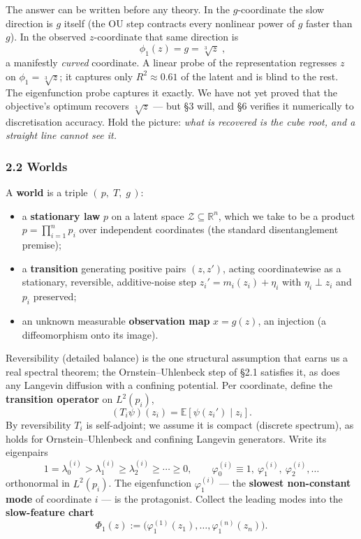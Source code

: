 \documentclass[
  letterpaper,
  11pt]{article}
\providecommand{\tightlist}{%
  \setlength{\itemsep}{0pt}\setlength{\parskip}{0pt}}
\theoremstyle{plain}
\theoremstyle{definition}
\theoremstyle{remark}
\begin{document}
The answer can be written before any theory. In the \(g\)-coordinate the slow direction is \(g\) itself (the OU step contracts every nonlinear power of \(g\) faster than \(g\)). In the observed \(z\)-coordinate that same direction is
\[\boxed{\;\phi_1(z) = g = \sqrt[3]{z}\;,}\]
a manifestly \emph{curved} coordinate. A linear probe of the representation regresses \(z\) on \(\phi_1=\sqrt[3]{z}\); it captures only \(R^2\approx 0.61\) of the latent and is blind to the rest. The eigenfunction probe captures it exactly. We have not yet proved that the objective's optimum recovers \(\sqrt[3]{z}\) --- but §3 will, and §6 verifies it numerically to discretisation accuracy. Hold the picture: \emph{what is recovered is the cube root, and a straight line cannot see it.}

\subsubsection{2.2 Worlds}\label{worlds}

A \textbf{world} is a triple \((\,p,\;T,\;g\,)\):

\begin{itemize}
\tightlist
\item
  a \textbf{stationary law} \(p\) on a latent space \(\mathcal Z\subseteq\mathbb R^n\), which we take to be a product \(p=\prod_{i=1}^n p_i\) over independent coordinates (the standard disentanglement premise);
\item
  a \textbf{transition} generating positive pairs \((z,z')\), acting coordinatewise as a stationary, reversible, additive-noise step \(z_i' = m_i(z_i)+\eta_i\) with \(\eta_i\perp z_i\) and \(p_i\) preserved;
\item
  an unknown measurable \textbf{observation map} \(x=g(z)\), an injection (a diffeomorphism onto its image).
\end{itemize}

Reversibility (detailed balance) is the one structural assumption that earns us a real spectral theorem; the Ornstein--Uhlenbeck step of §2.1 satisfies it, as does any Langevin diffusion with a confining potential. Per coordinate, define the \textbf{transition operator} on \(L^2(p_i)\),
\[(T_i\psi)(z_i) = \mathbb E[\psi(z_i')\mid z_i].\]
By reversibility \(T_i\) is self-adjoint; we assume it is compact (discrete spectrum), as holds for Ornstein--Uhlenbeck and confining Langevin generators. Write its eigenpairs
\[1=\lambda_0^{(i)}>\lambda_1^{(i)}\ge\lambda_2^{(i)}\ge\cdots\ge 0,\qquad \varphi_0^{(i)}\equiv 1,\ \varphi_1^{(i)},\ \varphi_2^{(i)},\dots\]
orthonormal in \(L^2(p_i)\). The eigenfunction \(\varphi_1^{(i)}\) --- the \textbf{slowest non-constant mode} of coordinate \(i\) --- is the protagonist. Collect the leading modes into the \textbf{slow-feature chart}
\[\Phi_1(z) := \big(\varphi_1^{(1)}(z_1),\dots,\varphi_1^{(n)}(z_n)\big).\]
\end{document}
